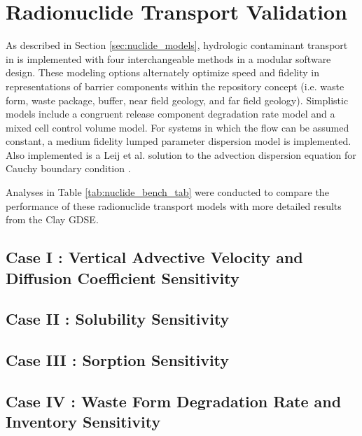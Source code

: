 \section{Radionuclide Transport Validation}\label{sec:nuclide_benchmarks}

As described in Section \ref{sec:nuclide_models}, hydrologic contaminant 
transport in \Cyder is implemented with four interchangeable  methods in a 
modular software design. These modeling options alternately optimize speed and 
fidelity in representations of barrier components within the repository concept 
(i.e. waste form, waste package, buffer, near field geology, and far field 
geology)\cite{huff_hydrologic_2013}.  Simplistic models include a congruent 
release component degradation rate model and a mixed cell control volume model. For 
systems in which the flow can be assumed constant, a medium fidelity lumped 
parameter dispersion model is implemented. Also implemented is a Leij et al. 
solution to the advection dispersion equation for Cauchy boundary condition 
\cite{leij_analytical_1991, van_genuchten_analytical_1982}.  

Analyses in Table \ref{tab:nuclide_bench_tab} were conducted to compare the 
performance of these radionuclide transport models with more detailed results from the 
Clay \gls{GDSE}. 




%
\subsection{Case I : Vertical Advective Velocity and Diffusion Coefficient Sensitivity}

\FloatBarrier
\subsection{Case II : Solubility Sensitivity}

\FloatBarrier
\subsection{Case III : Sorption Sensitivity}

\FloatBarrier
\subsection{Case IV : Waste Form Degradation Rate and Inventory Sensitivity}

%
\FloatBarrier
